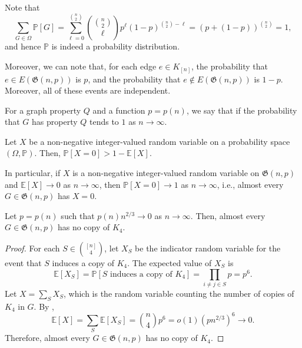 Note that
\begin{equation}
    \sum_{G \in \Omega} \mathbb{P}[G]
    = \sum_{\ell=0}^{\binom{n}{2}} \binom{\binom{n}{2}}{\ell} p^{\ell} (1-p)^{\binom{n}{2} - \ell}
    = \left( p + (1-p) \right)^{\binom{n}{2}} = 1,
\end{equation}
and hence \(\mathbb{P}\) is indeed a probability distribution.

Moreover, we can note that, for each edge \(e \in K_{[n]}\), the probability that \(e \in E(\mathfrak{G}(n, p))\) is \(p\), and the probability that \(e \not\in E(\mathfrak{G}(n, p))\) is \(1-p\).
Moreover, all of these events are independent.

For a graph property \(Q\) and a function \(p = p(n)\),
we say that  if the probability that \(G\) has property \(Q\) tends to \(1\) as \(n \to \infty\).

\begin{lemma}
    Let \(X\) be a non-negative integer-valued random variable on a probability space \((\Omega, \mathbb{P})\).
    Then, \(\mathbb{P}[X = 0] > 1 - \mathbb{E}[X]\).

    In particular,
    if \(X\) is a non-negative integer-valued random variable on \(\mathfrak{G}(n, p)\)
    and \(\mathbb{E}[X] \to 0\) as \(n \to \infty\),
    then \(\mathbb{P}[X = 0] \to 1\) as \(n \to \infty\),
    i.e.,
    almost every \(G \in \mathfrak{G}(n, p)\) has \(X = 0\).
\end{lemma}

\begin{proposition}
    Let \(p = p(n)\) such that \(p(n)n^{2/3} \to 0\) as \(n \to \infty\).
    Then, almost every \(G \in \mathfrak{G}(n, p)\) has no copy of \(K_4\).
\end{proposition}

\begin{proof}
    For each \(S \in \binom{[n]}{4}\), let \(X_S\) be the indicator random variable for the event that \(S\) induces a copy of \(K_4\).
    The expected value of \(X_S\) is
    \begin{equation}
        \mathbb{E}[X_S] = 
        \mathbb{P}[S \text{ induces a copy of } K_4] =
        \prod_{i \neq j \in S} p = p^6.
    \end{equation}
    Let \(X = \sum_{S} X_S\), which is the random variable counting the number of copies of \(K_4\) in \(G\).
    By ,
    \begin{equation}
        \mathbb{E}[X] = \sum_{S} \mathbb{E}[X_S] = \binom{n}{4} p^6 = o(1) (pn^{2/3})^6 \to 0.
    \end{equation}
    Therefore, almost every \(G \in \mathfrak{G}(n, p)\) has no copy of \(K_4\).
\end{proof}

